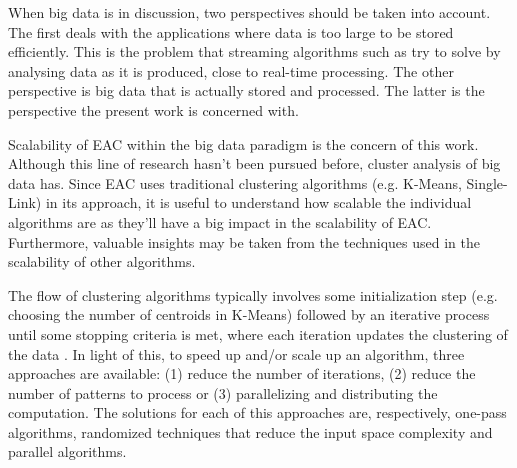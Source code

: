 


When big data is in discussion, two perspectives should be taken into account.%
The first deals with the applications where data is too large to be stored efficiently.
This is the problem that streaming algorithms such as \cite{bigdatastream} try to solve by analysing data as it is produced, close to real-time processing.
The other perspective is big data that is actually stored and processed.
The latter is the perspective the present work is concerned with.

Scalability of EAC within the big data paradigm is the concern of this work.
Although this line of research hasn't been pursued before, cluster analysis of big data has.
Since EAC uses traditional clustering algorithms (e.g. K-Means, Single-Link) in its approach, it is useful to understand how scalable the individual algorithms are as they'll have a big impact in the scalability of EAC.
Furthermore, valuable insights may be taken from the techniques used in the scalability of other algorithms.

The flow of clustering algorithms typically involves some initialization step (e.g. choosing the number of centroids in K-Means) followed by an iterative process until some stopping criteria is met, where each iteration updates the clustering of the data \cite{Aggarwal2014}.
In light of this, to speed up and/or scale up an algorithm, three approaches are available: (1) reduce the number of iterations, (2) reduce the number of patterns to process or (3) parallelizing and distributing the computation.
The solutions for each of this approaches are, respectively, one-pass algorithms, randomized techniques that reduce the input space complexity and parallel algorithms.

